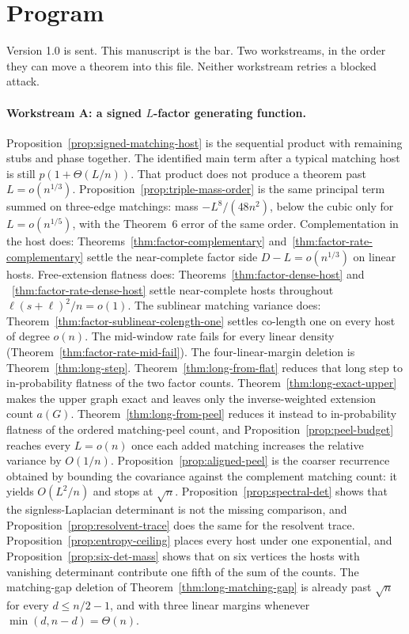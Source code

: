 \documentclass[11pt]{article}
\begin{document}
\section{Program}
\label{sec:program}

Version 1.0 is sent. This manuscript is the bar.
Two workstreams, in the order they can move a theorem into this file.
Neither workstream retries a blocked attack.

\paragraph{Workstream A: a signed \(L\)-factor generating function.}
Proposition~\ref{prop:signed-matching-host} is the sequential product
with remaining stubs and phase together.
The identified main term after a typical matching host is still
\(p(1+\Theta(L/n))\).
That product does not produce a theorem past \(L=o(n^{1/3})\).
Proposition~\ref{prop:triple-mass-order} is the same principal term summed on
three-edge matchings: mass \(-L^8/(48n^2)\), below the cubic only for
\(L=o(n^{1/5})\), with the Theorem~6 error of the same order.
Complementation in the host does: Theorems~\ref{thm:factor-complementary}
and~\ref{thm:factor-rate-complementary} settle the near-complete factor side
\(D-L=o(n^{1/3})\) on linear hosts.
Free-extension flatness does: Theorems~\ref{thm:factor-dense-host} and
~\ref{thm:factor-rate-dense-host} settle near-complete hosts throughout
\(\ell(s+\ell)^2/n=o(1)\).
The sublinear matching variance does: Theorem~\ref{thm:factor-sublinear-colength-one}
settles co-length one on every host of degree \(o(n)\).
The mid-window rate fails for every linear density
(Theorem~\ref{thm:factor-rate-mid-fail}).
The four-linear-margin deletion is Theorem~\ref{thm:long-step}.
Theorem~\ref{thm:long-from-flat} reduces that long step to in-probability
flatness of the two factor counts.
Theorem~\ref{thm:long-exact-upper} makes the upper graph exact and leaves
only the inverse-weighted extension count \(a(G)\).
Theorem~\ref{thm:long-from-peel} reduces it instead to in-probability flatness
of the ordered matching-peel count, and Proposition~\ref{prop:peel-budget}
reaches every \(L=o(n)\) once each added matching increases the relative
variance by \(O(1/n)\).
Proposition~\ref{prop:aligned-peel} is the coarser recurrence obtained by
bounding the covariance against the complement matching count: it yields
\(O(L^2/n)\) and stops at \(\sqrt{n}\).
Proposition~\ref{prop:spectral-det} shows that the signless-Laplacian
determinant is not the missing comparison, and
Proposition~\ref{prop:resolvent-trace} does the same for the resolvent trace.
Proposition~\ref{prop:entropy-ceiling} places every host under one exponential,
and Proposition~\ref{prop:six-det-mass} shows that on six vertices the hosts
with vanishing determinant contribute one fifth of the sum of the counts.
The matching-gap deletion of Theorem~\ref{thm:long-matching-gap}
is already past \(\sqrt{n}\) for every \(d\le n/2-1\), and with three linear
margins whenever \(\min(d,n-d)=\Theta(n)\).
\end{document}
